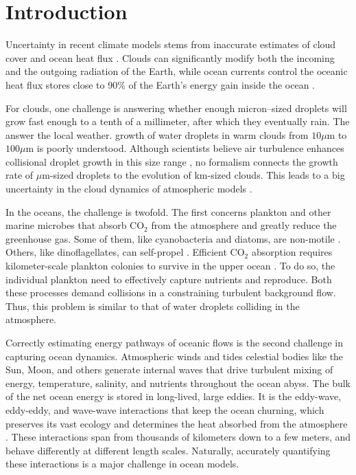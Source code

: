 \documentclass[../Rajarshi-thesis-draft.tex]{subfiles}
\begin{document}
\chapter{Introduction}
Uncertainty in  recent climate models  stems from inaccurate estimates of cloud cover and ocean heat flux \cite{meehl2020}. Clouds can significantly modify both the incoming and the outgoing radiation of the Earth, while ocean currents control the oceanic heat flux  stores close to 90\% of the Earth's energy gain inside the ocean \cite{vonschuckmann2023}. 



For clouds, one challenge is answering whether enough micron–sized droplets will grow fast enough to a tenth of a millimeter, after which they  eventually rain. The answer  the local weather.  growth of water droplets in warm clouds from $10\mu$m to $100\mu$m is poorly understood. Although scientists believe air turbulence enhances collisional droplet growth in this size range \cite{falkovich2002,bewley2013}, no formalism connects the growth rate of $\mu$m-sized droplets to the evolution of km-sized clouds. This leads to a big uncertainty in the cloud dynamics of atmospheric models \cite{liu2023}.

In the oceans, the challenge is twofold. The first concerns plankton and other marine microbes that absorb CO$_2$ from the atmosphere and greatly reduce the greenhouse gas. Some of them, like cyanobacteria and diatoms, are non-motile . Others, like dinoflagellates, can self-propel \cite{guasto2012}. Efficient CO$_2$ absorption requires kilometer-scale plankton colonies to survive in the upper ocean \cite{dovidio2010}. To do so, the individual plankton need to effectively capture nutrients and reproduce. Both these processes demand collisions in a constraining turbulent background flow. Thus, this problem is similar to that of water droplets colliding in the atmosphere. 


Correctly estimating energy pathways of oceanic flows is the second challenge in capturing ocean dynamics. Atmospheric winds and tides  celestial bodies like the Sun, Moon, and others generate internal waves that drive turbulent mixing of energy, temperature, salinity, and nutrients throughout the ocean abyss. The bulk of the net ocean energy is stored in long-lived, large eddies. It is the eddy-wave, eddy-eddy, and wave-wave interactions that keep the ocean churning, which preserves its vast ecology and determines the heat absorbed from the atmosphere \cite{klein2019}. These interactions span from thousands of kilometers down to a few meters, and behave differently at different length scales. Naturally, accurately quantifying these interactions is a major challenge in ocean models.
\end{document}
